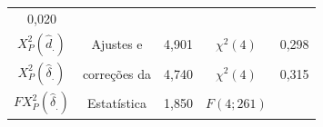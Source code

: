 \documentclass[]{book}
\theoremstyle{definition}
\theoremstyle{definition}
\theoremstyle{definition}
\theoremstyle{remark}
\begin{document}
\begin{longtable}[]{@{}cclcr@{}}
\begin{minipage}[t]{0.07\columnwidth}
0,020\strut
\end{minipage}\tabularnewline
\begin{minipage}[t]{0.40\columnwidth}\centering\strut
\(X_{P}^{2}\left( \hat{d}_{.}\right)\)\strut
\end{minipage} & \begin{minipage}[t]{0.15\columnwidth}\centering\strut
Ajustes e\strut
\end{minipage} & \begin{minipage}[t]{0.05\columnwidth}\raggedright\strut
4,901\strut
\end{minipage} & \begin{minipage}[t]{0.19\columnwidth}\centering\strut
\(\chi ^{2}(4)\)\strut
\end{minipage} & \begin{minipage}[t]{0.07\columnwidth}\raggedleft\strut
0,298\strut
\end{minipage}\tabularnewline
\begin{minipage}[t]{0.40\columnwidth}\centering\strut
\(X_{P}^{2}\left( \hat{\delta}_{.}\right)\)\strut
\end{minipage} & \begin{minipage}[t]{0.15\columnwidth}\centering\strut
correções da\strut
\end{minipage} & \begin{minipage}[t]{0.05\columnwidth}\raggedright\strut
4,740\strut
\end{minipage} & \begin{minipage}[t]{0.19\columnwidth}\centering\strut
\(\chi ^{2}(4)\)\strut
\end{minipage} & \begin{minipage}[t]{0.07\columnwidth}\raggedleft\strut
0,315\strut
\end{minipage}\tabularnewline
\begin{minipage}[t]{0.40\columnwidth}\centering\strut
\(FX_{P}^{2}\left( \hat{\delta}_{.}\right)\)\strut
\end{minipage} & \begin{minipage}[t]{0.15\columnwidth}\centering\strut
Estatística\strut
\end{minipage} & \begin{minipage}[t]{0.05\columnwidth}\raggedright\strut
1,850\strut
\end{minipage} & \begin{minipage}[t]{0.19\columnwidth}\centering\strut
\(F\left( 4;261\right)\)\strut
\end{minipage} & \begin{minipage}[t]{0.07\columnwidth}\raggedleft\strut

\end{minipage}
\end{longtable}
\end{document}
